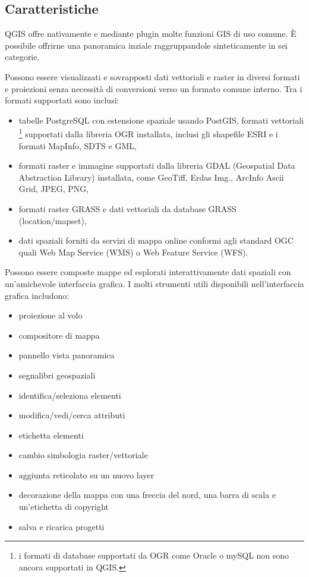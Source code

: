 \subsection{Caratteristiche}\label{label_majfeat}

QGIS offre nativamente e mediante plugin molte funzioni GIS di uso
comune. È possibile offrirne una panoramica inziale raggruppandole sinteticamente
in sei categorie.


Possono essere visualizzati e sovrapposti dati vettoriali e raster
in diversi formati e proiezioni senza necessità di conversioni verso un formato
comune interno. Tra i formati supportati sono inclusi:

\begin{itemize}
\item tabelle PostgreSQL con estensione spaziale usando PostGIS, formati vettoriali
\footnote{i formati di database supportati da OGR come Oracle o mySQL non sono 
ancora supportati in QGIS.} supportati dalla libreria OGR installata, inclusi gli
shapefile ESRI e i formati MapInfo, SDTS e GML,
\item formati raster e immagine supportati dalla libreria GDAL (Geospatial
Data Abstraction Library) installata, come GeoTiff, Erdas Img., ArcInfo
Ascii Grid, JPEG, PNG,
\item formati raster GRASS e dati vettoriali da database GRASS (location/mapset), 
\item dati spaziali forniti da servizi di mappa online conformi agli standard
OGC quali Web Map Service (WMS) o Web Feature Service (WFS).
\end{itemize}


Possono essere composte mappe ed esplorati interattivamente dati spaziali
con un'amichevole interfaccia grafica. I molti strumenti utili disponibili
nell'interfaccia grafica includono:
\begin{itemize}
\item proiezione al volo
\item compositore di mappa
\item pannello vista panoramica 
\item segnalibri geospaziali 
\item identifica/seleziona elementi
\item modifica/vedi/cerca attributi
\item etichetta elementi
\item cambio simbologia raster/vettoriale
\item aggiunta reticolato su un nuovo layer 
\item decorazione della mappa con una freccia del nord, una barra di scala e un'etichetta di copyright
\item salva e ricarica progetti
\end{itemize}


